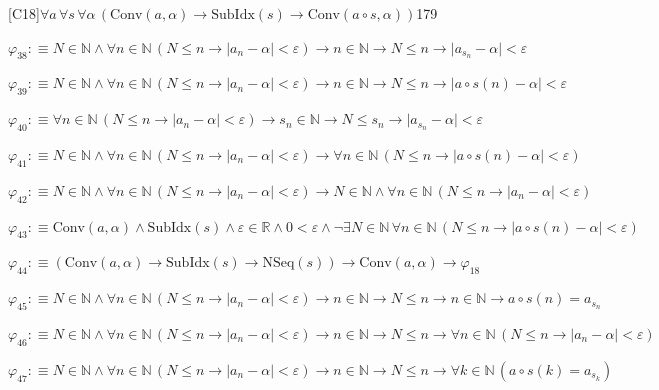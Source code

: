 \begin{fullproof}{[C18]}{$\forall a\,\forall s\,\forall \alpha\,(\mathrm{Conv}(a,\alpha) \to \mathrm{SubIdx}(s) \to \mathrm{Conv}(a \circ s,\alpha))$}{179}
\begin{abbrevlist}
\item $\varphi_{38} :\equiv N \in \mathbb{N} \land \forall n \in \mathbb{N}\,(N \leq n \to \lvert a_{n} - \alpha \rvert < \varepsilon) \to n \in \mathbb{N} \to N \leq n \to \lvert a_{s_{n}} - \alpha \rvert < \varepsilon$
\item $\varphi_{39} :\equiv N \in \mathbb{N} \land \forall n \in \mathbb{N}\,(N \leq n \to \lvert a_{n} - \alpha \rvert < \varepsilon) \to n \in \mathbb{N} \to N \leq n \to \lvert a \circ s(n) - \alpha \rvert < \varepsilon$
\item $\varphi_{40} :\equiv \forall n \in \mathbb{N}\,(N \leq n \to \lvert a_{n} - \alpha \rvert < \varepsilon) \to s_{n} \in \mathbb{N} \to N \leq s_{n} \to \lvert a_{s_{n}} - \alpha \rvert < \varepsilon$
\item $\varphi_{41} :\equiv N \in \mathbb{N} \land \forall n \in \mathbb{N}\,(N \leq n \to \lvert a_{n} - \alpha \rvert < \varepsilon) \to \forall n \in \mathbb{N}\,(N \leq n \to \lvert a \circ s(n) - \alpha \rvert < \varepsilon)$
\item $\varphi_{42} :\equiv N \in \mathbb{N} \land \forall n \in \mathbb{N}\,(N \leq n \to \lvert a_{n} - \alpha \rvert < \varepsilon) \to N \in \mathbb{N} \land \forall n \in \mathbb{N}\,(N \leq n \to \lvert a_{n} - \alpha \rvert < \varepsilon)$
\item $\varphi_{43} :\equiv \mathrm{Conv}(a,\alpha) \land \mathrm{SubIdx}(s) \land \varepsilon \in \mathbb{R} \land 0 < \varepsilon \land \neg \exists N \in \mathbb{N}\,\forall n \in \mathbb{N}\,(N \leq n \to \lvert a \circ s(n) - \alpha \rvert < \varepsilon)$
\item $\varphi_{44} :\equiv (\mathrm{Conv}(a,\alpha) \to \mathrm{SubIdx}(s) \to \mathrm{NSeq}(s)) \to \mathrm{Conv}(a,\alpha) \to \varphi_{18}$
\item $\varphi_{45} :\equiv N \in \mathbb{N} \land \forall n \in \mathbb{N}\,(N \leq n \to \lvert a_{n} - \alpha \rvert < \varepsilon) \to n \in \mathbb{N} \to N \leq n \to n \in \mathbb{N} \to a \circ s(n) = a_{s_{n}}$
\item $\varphi_{46} :\equiv N \in \mathbb{N} \land \forall n \in \mathbb{N}\,(N \leq n \to \lvert a_{n} - \alpha \rvert < \varepsilon) \to n \in \mathbb{N} \to N \leq n \to \forall n \in \mathbb{N}\,(N \leq n \to \lvert a_{n} - \alpha \rvert < \varepsilon)$
\item $\varphi_{47} :\equiv N \in \mathbb{N} \land \forall n \in \mathbb{N}\,(N \leq n \to \lvert a_{n} - \alpha \rvert < \varepsilon) \to n \in \mathbb{N} \to N \leq n \to \forall k \in \mathbb{N}\,(a \circ s(k) = a_{s_{k}})$

\end{abbrevlist}
\end{fullproof}
